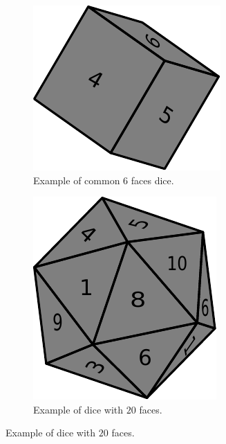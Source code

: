 \begin{figure}
\begin{subfigure}[t]{0.25\textwidth}
		\includegraphics[width=1\linewidth]{sources/dice_rolls/images/cubic_dice}
		\caption{Example of common $6$ faces dice.}
		\label{fig:cycle_in_list:6faces_dice}
	 \end{subfigure}
	 \hfill
	 \begin{subfigure}[t]{0.25\textwidth}
		 \includegraphics[width=1\linewidth]{sources/dice_rolls/images/icosahedron_dice}
		 \caption{Example of dice with $20$ faces.}
		 \label{fig:cycle_in_list:20faces_dice}
	  \end{subfigure}
\end{figure}

